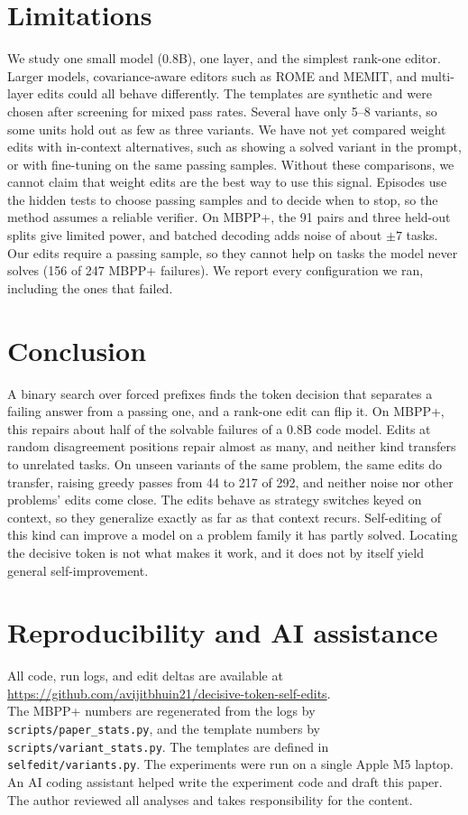 \documentclass[11pt]{article}
\begin{document}
\section{Limitations}
We study one small model (0.8B), one layer, and the simplest rank-one editor. Larger models, covariance-aware editors such as ROME and MEMIT, and multi-layer edits could all behave differently. The templates are synthetic and were chosen after screening for mixed pass rates. Several have only 5--8 variants, so some units hold out as few as three variants. We have not yet compared weight edits with in-context alternatives, such as showing a solved variant in the prompt, or with fine-tuning on the same passing samples. Without these comparisons, we cannot claim that weight edits are the best way to use this signal. Episodes use the hidden tests to choose passing samples and to decide when to stop, so the method assumes a reliable verifier. On MBPP+, the 91 pairs and three held-out splits give limited power, and batched decoding adds noise of about $\pm 7$ tasks. Our edits require a passing sample, so they cannot help on tasks the model never solves (156 of 247 MBPP+ failures). We report every configuration we ran, including the ones that failed.

\section{Conclusion}
A binary search over forced prefixes finds the token decision that separates a failing answer from a passing one, and a rank-one edit can flip it. On MBPP+, this repairs about half of the solvable failures of a 0.8B code model. Edits at random disagreement positions repair almost as many, and neither kind transfers to unrelated tasks. On unseen variants of the same problem, the same edits do transfer, raising greedy passes from 44 to 217 of 292, and neither noise nor other problems' edits come close. The edits behave as strategy switches keyed on context, so they generalize exactly as far as that context recurs. Self-editing of this kind can improve a model on a problem family it has partly solved. Locating the decisive token is not what makes it work, and it does not by itself yield general self-improvement.

\section*{Reproducibility and AI assistance}
All code, run logs, and edit deltas are available at\\
\url{https://github.com/avijitbhuin21/decisive-token-self-edits}.\\
\sloppy
The MBPP+ numbers are regenerated from the logs by \texttt{scripts/paper\_stats.py}, and the template numbers by \texttt{scripts/variant\_stats.py}. The templates are defined in \texttt{selfedit/variants.py}. The experiments were run on a single Apple M5 laptop. An AI coding assistant helped write the experiment code and draft this paper. The author reviewed all analyses and takes responsibility for the content.



\end{document}
